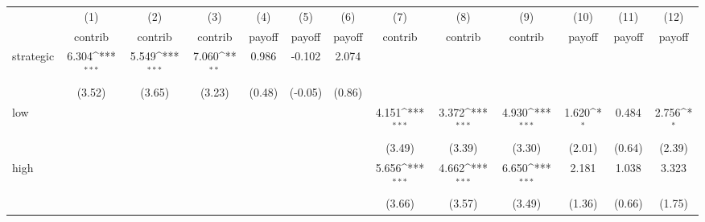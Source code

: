 {
\def\sym#1{\ifmmode^{#1}\else\(^{#1}\)\fi}
\begin{tabular}{l*{12}{c}}
\toprule
            &\multicolumn{1}{c}{(1)}&\multicolumn{1}{c}{(2)}&\multicolumn{1}{c}{(3)}&\multicolumn{1}{c}{(4)}&\multicolumn{1}{c}{(5)}&\multicolumn{1}{c}{(6)}&\multicolumn{1}{c}{(7)}&\multicolumn{1}{c}{(8)}&\multicolumn{1}{c}{(9)}&\multicolumn{1}{c}{(10)}&\multicolumn{1}{c}{(11)}&\multicolumn{1}{c}{(12)}\\
            &\multicolumn{1}{c}{contrib}&\multicolumn{1}{c}{contrib}&\multicolumn{1}{c}{contrib}&\multicolumn{1}{c}{payoff}&\multicolumn{1}{c}{payoff}&\multicolumn{1}{c}{payoff}&\multicolumn{1}{c}{contrib}&\multicolumn{1}{c}{contrib}&\multicolumn{1}{c}{contrib}&\multicolumn{1}{c}{payoff}&\multicolumn{1}{c}{payoff}&\multicolumn{1}{c}{payoff}\\
\midrule
strategic   &       6.304\sym{***}&       5.549\sym{***}&       7.060\sym{**} &       0.986         &      -0.102         &       2.074         &                     &                     &                     &                     &                     &                     \\
            &      (3.52)         &      (3.65)         &      (3.23)         &      (0.48)         &     (-0.05)         &      (0.86)         &                     &                     &                     &                     &                     &                     \\
\addlinespace
low         &                     &                     &                     &                     &                     &                     &       4.151\sym{***}&       3.372\sym{***}&       4.930\sym{***}&       1.620\sym{*}  &       0.484         &       2.756\sym{*}  \\
            &                     &                     &                     &                     &                     &                     &      (3.49)         &      (3.39)         &      (3.30)         &      (2.01)         &      (0.64)         &      (2.39)         \\
\addlinespace
high        &                     &                     &                     &                     &                     &                     &       5.656\sym{***}&       4.662\sym{***}&       6.650\sym{***}&       2.181         &       1.038         &       3.323         \\
            &                     &                     &                     &                     &                     &                     &      (3.66)         &      (3.57)         &      (3.49)         &      (1.36)         &      (0.66)         &      (1.75)         \\

\end{tabular}}
